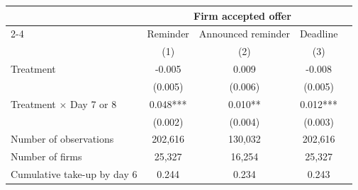 \begin{tabular}{lcccc}
\toprule
 & \multicolumn{3}{c}{Firm accepted offer} \\
\cmidrule(lr){2-4}
\multicolumn{1}{r}{Treatment:} & \multicolumn{1}{c}{Reminder} & \multicolumn{1}{c}{Announced reminder} & \multicolumn{1}{c}{Deadline} \\
 & (1) & (2) & (3) \\
\midrule
Treatment & -0.005 & 0.009 & -0.008 \\ & (0.005) & (0.006) & (0.005) \\
Treatment $\times$ Day 7 or 8 & 0.048*** & 0.010** & 0.012*** \\ & (0.002) & (0.004) & (0.003) \\
\midrule
Number of observations & 202,616 & 130,032 & 202,616 \\
Number of firms & 25,327 & 16,254 & 25,327 \\
Cumulative take-up by day 6 & 0.244 & 0.234 & 0.243 \\
\bottomrule
\end{tabular}

